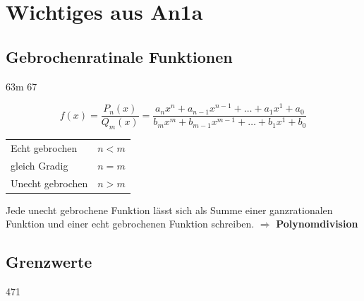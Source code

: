 \section{Wichtiges aus An1a}


\subsection{Gebrochenratinale Funktionen}{63m 67}

\[
f(x) = \frac{P_n(x)}{Q_m(x)} = \frac{a_nx^n + a_{n-1}x^{n-1} + \ldots + a_1x^1 + a_0}{b_mx^m + b_{m-1}x^{m-1} + \ldots + b_1x^1 + b_0}
\]

\begin{tabular}{l l}
    Echt gebrochen      &   $n < m$ \\
    gleich Gradig       &   $n = m$ \\
    Unecht gebrochen    &   $n > m$
\end{tabular}

\vspace{0.2cm}
Jede unecht gebrochene Funktion lässt sich als Summe einer ganzrationalen Funktion und einer echt gebrochenen Funktion schreiben. $\Rightarrow$ \textbf{Polynomdivision}


\subsection{Grenzwerte}{471}

